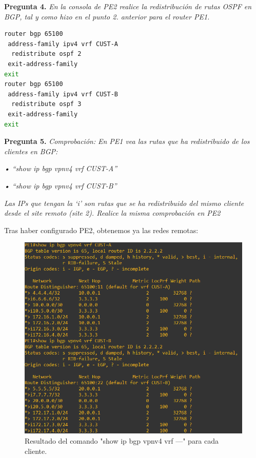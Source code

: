 \documentclass[a4paper, 12pt]{report}
\begin{document}
\textbf{Pregunta 4.}
\textit{
	En la consola de PE2 realice la redistribución de rutas OSPF en BGP, tal y como hizo en el
punto 2. anterior para el router PE1.
}

\begin{lstlisting}[language=bash, caption={Configuración de bgp en PE2}]
router bgp 65100
 address-family ipv4 vrf CUST-A
  redistribute ospf 2
 exit-address-family
exit
router bgp 65100
 address-family ipv4 vrf CUST-B
  redistribute ospf 3
 exit-address-family
exit
\end{lstlisting}

\textbf{Pregunta 5.}
\textit{ Comprobación:}
\textit{En PE1 vea las rutas que ha redistribuido de los clientes en BGP:}

\textit{• “show ip bgp vpnv4 vrf CUST-A”}

\textit{• “show ip bgp vpnv4 vrf CUST-B”}


\textit{Las IPs que tengan la ‘i’ son rutas que se ha redistribuido del mismo cliente desde el site
remoto (site 2). Realice la misma comprobación en PE2
}

Tras haber configurado PE2, obtenemos ya las redes remotas:

\begin{figure}[H]
	\centering
	\includegraphics[scale=0.6]{showipbgpNUEVOPE1.png}
	\caption{Resultado del comando "show ip bgp vpnv4 vrf ---" para cada cliente.}
	\label{fig:showipbgpNUEVOPE1}
\end{figure}
\end{document}
